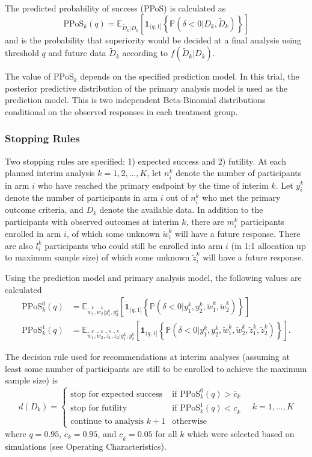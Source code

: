 \documentclass{bmcart}
\begin{document}
The predicted probability of success (PPoS) \cite{berry2010bayesian} is calculated as
$$
\text{PPoS}_k(q) = \mathbb E_{\tilde D_k | D_k}\left[\textbf{1}_{(q,1]}\left\{\mathbb P(\delta<0|D_k,\tilde D_k)\right\}\right]
$$
and is the probability that superiority would be decided at a final analysis using threshold $q$ and future data $\tilde D_k$ according to $f(\tilde D_k|D_k)$.

The value of \(\text{PPoS}_k\) depends on the specified prediction model.
In this trial, the posterior predictive distribution of the primary analysis model is used as the prediction model.
This is two independent Beta-Binomial distributions conditional on the observed responses in each treatment group.

\subsubsection*{Stopping Rules}

Two stopping rules are specified: 1) expected success and 2) futility.
At each planned interim analysis $k=1,2,...,K$, let $n_i^k$ denote the number of participants in arm $i$ who have reached the primary endpoint by the time of interim $k$.
Let $y_i^k$ denote the number of participants in arm $i$ out of $n_i^k$ who met the primary outcome criteria, and $D_k$ denote the available data.
In addition to the participants with observed outcomes at interim $k$, there are $m_i^k$ participants enrolled in arm $i$, of which some unknown $\tilde w_i^k$ will have a future response. There are also $l_i^k$ participants who could still be enrolled into arm $i$ (in 1:1 allocation up to maximum sample size) of which some unknown $\tilde z_i^k$ will have a future response.

Using the prediction model and primary analysis model, the following values are calculated
$$
\begin{aligned}
\text{PPoS}_k^0(q) &= \mathbb E_{\tilde w_1^k,\tilde w_2^k|y_1^k,y_2^k}\left[\textbf{1}_{(q,1]}\left\{\mathbb P\left(\delta<0|y_1^k,y_2^k,\tilde w_1^k,\tilde w_2^k\right)\right\}\right] \\
\text{PPoS}_k^1(q) &= \mathbb E_{\tilde w_1^k,\tilde w_2^k,\tilde z_1^k,\tilde z_2^k|y_1^k,y_2^k}\left[\textbf{1}_{(q,1]}\left\{\mathbb P\left(\delta<0|y_1^k,y_2^k,\tilde w_1^k,\tilde w_2^k,\tilde z_1^k,\tilde z_2^k\right)\right\}\right].
\end{aligned}
$$

The decision rule used for recommendations at interim analyses (assuming at least some number of participants are still to be enrolled to achieve the maximum sample size) is
$$
d(D_k)=\begin{cases}
\text{stop for expected success} & \text{if } \text{PPoS}_k^0(q) > \overline{c}_k \\
\text{stop for futility} & \text{if } \text{PPoS}_k^1(q) < \underline{c}_k \\
\text{continue to analysis }k+1 &\text{otherwise}
\end{cases} \quad k=1,...,K
$$
where $q=0.95$, $\overline{c}_k=0.95$, and $\underline{c}_k=0.05$ for all $k$ which were selected based on simulations (see Operating Characteristics).
\end{document}
